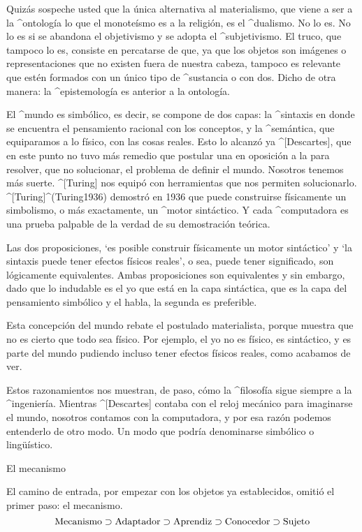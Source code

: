 Quizás sospeche usted que la única alternativa al materialismo, que
viene a ser a la ^{ontología} lo que el monoteísmo es a la religión, es
el ^{dualismo}. No lo es. No lo es si se abandona el objetivismo y se
adopta el ^{subjetivismo}. El truco, que tampoco lo es, consiste en
percatarse de que, ya que los objetos son imágenes o representaciones
que no existen fuera de nuestra cabeza, tampoco es relevante que estén
formados con un único tipo de ^{sustancia} o con dos. Dicho de otra
manera: la ^{epistemología} es anterior a la ontología.

El ^{mundo} es simbólico, es decir, se compone de dos capas: la
^{sintaxis} en donde se encuentra el pensamiento racional con los
conceptos, y la ^{semántica}, que equiparamos a lo físico, con las cosas
reales. Esto lo alcanzó ya ^[Descartes], que en este punto no tuvo más
remedio que postular una  en oposición a la
 para resolver, que no solucionar, el problema de
definir el mundo. Nosotros tenemos más suerte. ^[Turing] nos equipó con
herramientas que nos permiten solucionarlo. ^[Turing]^(Turing1936)
demostró en 1936 que puede construirse físicamente un simbolismo, o más
exactamente, un ^{motor sintáctico}. Y cada ^{computadora} es una prueba
palpable de la verdad de su demostración teórica.


Las dos proposiciones, `es posible construir físicamente un motor
sintáctico' y `la sintaxis puede tener efectos físicos reales', o sea,
puede tener significado, son lógicamente equivalentes. Ambas
proposiciones son equivalentes y sin embargo, dado que lo indudable es
el yo que está en la capa sintáctica, que es la capa del pensamiento
simbólico y el habla, la segunda es preferible.

Esta concepción del mundo rebate el postulado materialista, porque
muestra que no es cierto que todo sea físico. Por ejemplo, el yo no es
físico, es sintáctico, y es parte del mundo pudiendo incluso tener
efectos físicos reales, como acabamos de ver.

Estos razonamientos nos muestran, de paso, cómo la ^{filosofía} sigue
siempre a la ^{ingeniería}. Mientras ^[Descartes] contaba con el reloj
mecánico para imaginarse el mundo, nosotros contamos con la computadora,
y por esa razón podemos entenderlo de otro modo. Un modo que podría
denominarse simbólico o lingüístico.


\Section El mecanismo

El camino de entrada, por empezar con los objetos ya establecidos,
omitió el primer paso: el mecanismo.
$$\hbox{Mecanismo} \supset \hbox{Adaptador} \supset
  \hbox{Aprendiz} \supset \hbox{Conocedor} \supset \hbox{Sujeto}
\abovedisplayskip=9pt
\belowdisplayskip=9pt
$$

